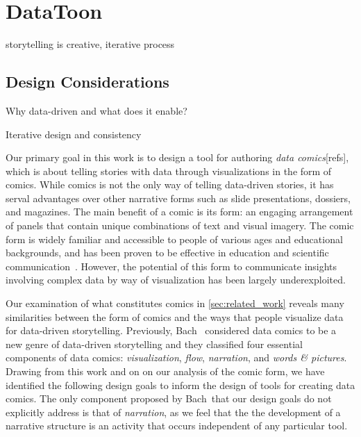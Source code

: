 \section{DataToon}
\label{sec:datatoon}

storytelling  is creative, iterative process

\subsection{Design Considerations}

Why data-driven and what does it enable?

Iterative design and consistency


Our primary goal in this work is to design a tool for authoring \textit{data comics}[refs], which is about telling stories with data through visualizations in the form of comics. While comics is not the only way of telling data-driven stories, it has serval advantages over other narrative forms such as slide presentations, dossiers, and magazines. The main benefit of a comic is its form: an engaging arrangement of panels that contain unique combinations of text and visual imagery. The comic form is widely familiar and accessible to people of various ages and educational backgrounds, and has been proven to be effective in education and scientific communication~\cite{ref}. However, the potential of this form to communicate insights involving complex data by way of visualization has been largely underexploited.

Our examination of what constitutes comics in \autoref{sec:related_work} reveals many similarities between the form of comics and the ways that people visualize data for data-driven storytelling. Previously, Bach~\etal\cite{bach2017emerging} considered data comics to be a new genre of data-driven storytelling and they classified four essential components of data comics: {\it visualization}, {\it flow}, {\it narration}, and {\it words \& pictures}. 
Drawing from this work and on on our analysis of the comic form, we have identified the following design goals to inform the design of tools for creating data comics. The only component proposed by Bach~\etal that our design goals do not explicitly address is that of {\it narration}, as we feel that the the development of a narrative structure is an activity that occurs independent of any particular tool. 





